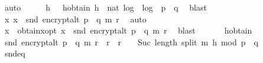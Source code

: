 \begin{isabellebody}
\ auto\isanewline
\ \ \isamarkupfalse%
\ \isamarkupfalse%
\ h\ \ \ h{\isacharunderscore}{\kern0pt}obtain{\isacharcolon}{\kern0pt}\ {\isachardoublequoteopen}h\ {\isacharequal}{\kern0pt}\ nat\ {\isasymlfloor}log\ {}\ {\isacharparenleft}{\kern0pt}log\ {}\ {\isacharparenleft}{\kern0pt}p\ {\isacharasterisk}{\kern0pt}\ q{\isacharparenright}{\kern0pt}{\isacharparenright}{\kern0pt}{\isasymrfloor}{\isachardoublequoteclose}\ \isamarkupfalse%
\ blast\isanewline
\isanewline
\ \ \isamarkupfalse%
\ {\isachardoublequoteopen}{\isasymexists}x{\isachardot}{\kern0pt}\ x\ {\isacharequal}{\kern0pt}\ snd\ {\isacharparenleft}{\kern0pt}encrypt{\isacharunderscore}{\kern0pt}alt\ {\isacharparenleft}{\kern0pt}p\ {\isacharasterisk}{\kern0pt}\ q{\isacharparenright}{\kern0pt}\ m\ r{\isacharparenright}{\kern0pt}{\isachardoublequoteclose}\ \isamarkupfalse%
\ auto\isanewline
\ \ \isamarkupfalse%
\ \isamarkupfalse%
\ x\ \ obtain{\isacharunderscore}{\kern0pt}x{\isacharunderscore}{\kern0pt}opt{}{\isacharcolon}{\kern0pt}\ {\isachardoublequoteopen}x\ {\isacharequal}{\kern0pt}\ snd\ {\isacharparenleft}{\kern0pt}encrypt{\isacharunderscore}{\kern0pt}alt\ {\isacharparenleft}{\kern0pt}p\ {\isacharasterisk}{\kern0pt}\ q{\isacharparenright}{\kern0pt}\ m\ r{\isacharparenright}{\kern0pt}{\isachardoublequoteclose}\ \isamarkupfalse%
\ blast\isanewline
\isanewline
\ \ \isanewline
\ \ \isamarkupfalse%
\ h{\isacharunderscore}{\kern0pt}obtain\ \isamarkupfalse%
\ {\isachardoublequoteopen}snd\ {\isacharparenleft}{\kern0pt}encrypt{\isacharunderscore}{\kern0pt}alt\ {\isacharparenleft}{\kern0pt}p\ {\isacharasterisk}{\kern0pt}\ q{\isacharparenright}{\kern0pt}\ m\ r{\isacharparenright}{\kern0pt}\ {\isacharequal}{\kern0pt}\ {\isacharparenleft}{\kern0pt}r\ {\isacharasterisk}{\kern0pt}\ r{\isacharparenright}{\kern0pt}\ {\isacharcircum}{\kern0pt}\ {\isacharparenleft}{\kern0pt}{}\ {\isacharcircum}{\kern0pt}\ {\isacharparenleft}{\kern0pt}Suc\ {\isacharparenleft}{\kern0pt}length\ {\isacharparenleft}{\kern0pt}split\ m\ h{\isacharparenright}{\kern0pt}{\isacharparenright}{\kern0pt}{\isacharparenright}{\kern0pt}{\isacharparenright}{\kern0pt}\ mod\ {\isacharparenleft}{\kern0pt}p\ {\isacharasterisk}{\kern0pt}\ q{\isacharparenright}{\kern0pt}{\isachardoublequoteclose}\isanewline
\ \ \ \ \isamarkupfalse%
\ snd{\isacharunderscore}{\kern0pt}eq\ \isamarkupfalse%

\end{isabellebody}
